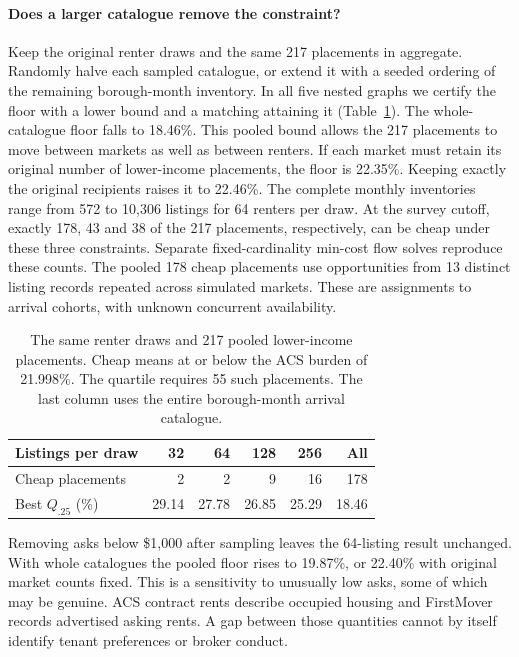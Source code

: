\paragraph{Does a larger catalogue remove the constraint?}
Keep the original renter draws and the same 217 placements in aggregate. Randomly halve each sampled catalogue, or extend it with a seeded ordering of the remaining borough-month inventory. In all five nested graphs we certify the floor with a lower bound and a matching attaining it (Table~\ref{tab:volume}). The whole-catalogue floor falls to 18.46\%. This pooled bound allows the 217 placements to move between markets as well as between renters. If each market must retain its original number of lower-income placements, the floor is 22.35\%. Keeping exactly the original recipients raises it to 22.46\%. The complete monthly inventories range from 572 to 10,306 listings for 64 renters per draw. At the survey cutoff, exactly 178, 43 and 38 of the 217 placements, respectively, can be cheap under these three constraints. Separate fixed-cardinality min-cost flow solves reproduce these counts. The pooled 178 cheap placements use opportunities from 13 distinct listing records repeated across simulated markets. These are assignments to arrival cohorts, with unknown concurrent availability.

\begin{table}[t]
\centering\small
\begin{tabular}{@{}lrrrrr@{}}\toprule
Listings per draw &32&64&128&256&All\\\midrule
Cheap placements &2&2&9&16&178\\
Best $Q_{.25}$ (\%) &29.14&27.78&26.85&25.29&18.46\\\bottomrule
\end{tabular}
\caption{The same renter draws and 217 pooled lower-income placements. Cheap means at or below the ACS burden of 21.998\%. The quartile requires 55 such placements. The last column uses the entire borough-month arrival catalogue.}
\label{tab:volume}
\end{table}
Removing asks below \$1,000 after sampling leaves the 64-listing result unchanged. With whole catalogues the pooled floor rises to 19.87\%, or 22.40\% with original market counts fixed. This is a sensitivity to unusually low asks, some of which may be genuine. ACS contract rents describe occupied housing and FirstMover records advertised asking rents. A gap between those quantities cannot by itself identify tenant preferences or broker conduct.

